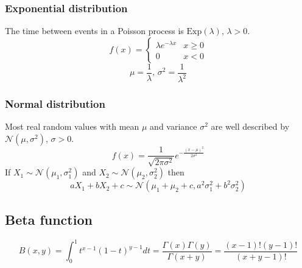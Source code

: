 \subsubsection{Exponential distribution}
The time between events in a Poisson process is $\textrm{Exp}(\lambda),\,\lambda>0$.
\[f(x) = \left\{
\begin{array}{cl}
\lambda e^{-\lambda x} & x\geq0\\
0 & x<0
\end{array}\right.\]
\[\mu=\frac{1}{\lambda},\,\sigma^2=\frac{1}{\lambda^2}\]

\subsubsection{Normal distribution}
Most real random values with mean $\mu$ and variance $\sigma^2$ are well described by $\mathcal{N}(\mu,\sigma^2),\,\sigma>0$.
\[ f(x) = \frac{1}{\sqrt{2\pi\sigma^2}}e^{-\frac{(x-\mu)^2}{2\sigma^2}} \]
If $X_1 \sim \mathcal{N}(\mu_1,\sigma_1^2)$ and $X_2 \sim \mathcal{N}(\mu_2,\sigma_2^2)$ then
\[ aX_1 + bX_2 + c \sim \mathcal{N}(\mu_1+\mu_2+c,a^2\sigma_1^2+b^2\sigma_2^2) \]

\subsection{Beta function}

$$B(x, y) = \int_{0}^1 t^{x - 1}(1 - t)^{y - 1} dt = \frac{\Gamma(x) \Gamma(y)}{\Gamma(x+y)} = \frac{(x-1)!(y-1)!}{(x+y-1)!}$$



